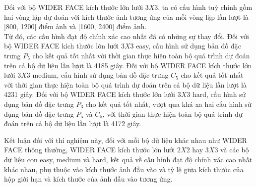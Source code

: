 {    \noindent
    Đối với bộ WIDER FACE kích thước lớn lưới $3 X 3$, ta có cấu hình tuỳ chỉnh gồm hai vòng lặp dự đoán với kích thước ảnh tương ứng của mỗi vòng lặp lần lượt là [800, 1200] điểm ảnh và [1600, 2400] điểm ảnh. \\
    Từ đó, các cấu hình đạt độ chính xác cao nhất đã có những sự thay đổi.
    Đối với bộ WIDER FACE kích thước lớn lưới $3 X 3$ easy, cấu hình sử dụng bản đồ đặc trưng ${P}_{5}$ cho kết quả tốt nhất với thời gian thực hiện toàn bộ quá trình dự đoán trên cả bộ dữ liệu lần lượt là 4185 giây.
    Đối với bộ WIDER FACE kích thước lớn lưới $3 X 3$ medium, cấu hình sử dụng bản đồ đặc trưng ${C}_{5}$ cho kết quả tốt nhất với thời gian thực hiện toàn bộ quá trình dự đoán trên cả bộ dữ liệu lần lượt là 4231 giây.
    Đối với bộ WIDER FACE kích thước lớn lưới $3 X 3$ hard, cấu hình sử dụng bản đồ đặc trưng ${P}_{3}$ cho kết quả tốt nhất, vượt qua khá xa hai cấu hình sử dụng bản đồ đặc trưng ${P}_{5}$ và ${C}_{5}$, với thời gian thực hiện toàn bộ quá trình dự đoán trên cả bộ dữ liệu lần lượt là 4172 giây.

    \noindent
    Kết luận đối với thí nghiệm này, đối với mỗi bộ dữ liệu khác nhau như WIDER FACE thông thường, WIDER FACE kích thước lớn lưới $2 X 2$ hay $3 X 3$ và các bộ dữ liệu con easy, medium và hard, kết quả về cấu hình đạt độ chính xác cao nhất khác nhau, phụ thuộc vào kích thước ảnh đầu vào và tỷ lệ giữa kích thước của hộp giới hạn và kích thước của ảnh đầu vào tương ứng.

}
